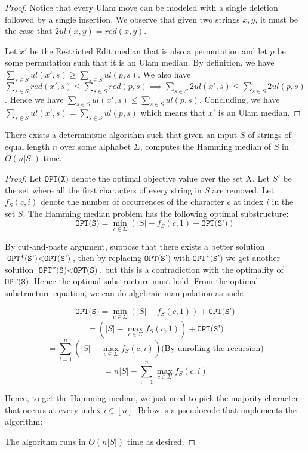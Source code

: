 \begin{proof}
    Notice that every Ulam move can be modeled with a single deletion followed by a single insertion. We observe that given two strings $x, y$, it must be the case that $2 ul(x, y) = red(x, y)$.

    Let $x'$ be the Restricted Edit median that is also a permutation and let $p$ be some permutation such that it is an Ulam median. By definition, we have $\sum\limits_{s \in S} ul(x', s) \geq \sum\limits_{s \in S} ul(p, s)$. We also have $\sum\limits_{s \in S} red(x', s) \leq \sum\limits_{s \in S} red(p, s) \implies \sum\limits_{s \in S} 2 ul(x', s) \leq \sum\limits_{s \in S} 2 ul(p, s)$. Hence we have $\sum\limits_{s \in S} ul(x', s) \leq \sum\limits_{s \in S} ul(p, s)$. Concluding, we have $\sum\limits_{s \in S} ul(x', s) = \sum\limits_{s \in S} ul(p, s)$ which means that $x'$ is an Ulam median.
\end{proof}

\begin{theorem}
\label{Median Hamming}
    There exists a deterministic algorithm such that given an input $S$ of strings of equal length $n$ over some alphabet $\Sigma$, computes the Hamming median of $S$ in $O(n |S|)$ time.
\end{theorem}

\begin{proof}
    Let $\texttt{OPT(X)}$ denote the optimal objective value over the set $X$. Let $S'$ be the set where all the first characters of every string in $S$ are removed. Let $f_S(c, i)$ denote the number of occurrences of the character $c$ at index $i$ in the set $S$. The Hamming median problem has the following optimal substructure:
    \[\texttt{OPT(S)} = \min_{c \in \Sigma}\left(|S| -  f_S(c, 1) + \texttt{OPT(S')}\right)\]

    By cut-and-paste argument, suppose that there exists a better solution $\texttt{OPT*(S')} < \texttt{OPT(S')}$, then by replacing $\texttt{OPT(S')}$ with $\texttt{OPT*(S')}$ we get another solution $\texttt{OPT*(S)} < \texttt{OPT(S)}$, but this is a contradiction with the optimality of $\texttt{OPT(S)}$. Hence the optimal substructure must hold. From the optimal substructure equation, we can do algebraic manipulation as such:

    \[\texttt{OPT(S)} = \min_{c \in \Sigma}\left(|S| -  f_S(c, 1)\right) + \texttt{OPT(S')}\]
    \[= \left(|S| - \max_{c \in \Sigma} f_S(c, 1)\right) + \texttt{OPT(S')}\]
    \[= \sum_{i = 1}^n \left(|S| - \max_{c \in \Sigma} f_S(c, i)\right) \text{(By unrolling the recursion)}\]
    \[= n|S| - \sum_{i = 1}^n \max_{c \in \Sigma} f_S(c, i)\]

    Hence, to get the Hamming median, we just need to pick the majority character that occurs at every index $i \in [n]$. Below is a pseudocode that implements the algorithm:
    
    

    The algorithm runs in $O(n|S|)$ time as desired.
\end{proof}

